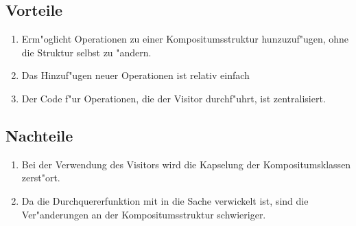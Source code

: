 \subsection{Vorteile}
\begin{enumerate}
\item Erm"oglicht Operationen zu einer Kompositumsstruktur hunzuzuf"ugen, ohne die Struktur selbst zu "andern.
\item Das Hinzuf"ugen neuer Operationen ist relativ einfach
\item Der Code f"ur Operationen, die der Visitor durchf"uhrt, ist zentralisiert.
\end{enumerate}

\subsection{Nachteile}
\begin{enumerate}
\item Bei der Verwendung des Visitors wird die Kapselung der Kompositumsklassen zerst"ort.
\item Da die Durchquererfunktion mit in die Sache verwickelt ist, sind die Ver"anderungen an der Kompositumsstruktur schwieriger.
\end{enumerate}

